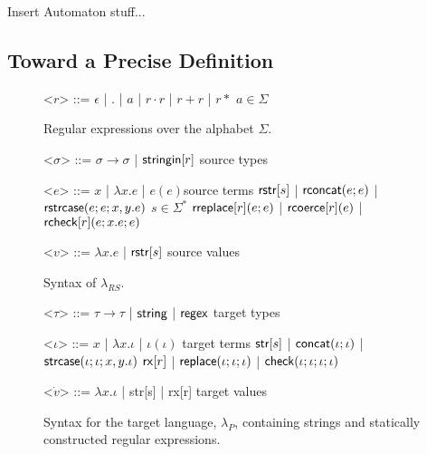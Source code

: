 \documentclass[12pt]{article}
\theoremstyle{definition}
\newcommand{\lambdap}{\lambda_P}
\newcommand{\sisubst}[3]{{\sf rreplace}[#1](#2;#3)} \newcommand{\rreplace}[3]{{\sf rreplace}[#1](#2;#3)} %
\newcommand{\rcoerce}[2]{{\sf rcoerce}[#1](#2)}
\newcommand{\sistr}[1]{{\sf rstr}[#1]}   \newcommand{\rstr}[1]{{\sf rstr}[#1]} %
\newcommand{\rcheck}[4]{ {\sf rcheck}[#1](#2;#3;#4) }
\newcommand{\strin}[1]{\sistr{#1}}
\newcommand{\rsconcat}[2]{{\sf rconcat}(#1;#2)} \newcommand{\rconcat}[2]{{\sf rconcat}(#1;#2)} %
\newcommand{\stringin}[1]{{\sf stringin}[#1]}
\newcommand{\tcheck}[4]{{\sf check}(#1; #2; #3; #4)}
\renewcommand{\tstr}[1]{{{\sf str}[#1]}}
\newcommand{\preplace}[3]{{\sf replace}(#1;#2;#3)}
\newcommand{\tconcat}[2]{{\sf concat}(#1;#2)} \newcommand{\concat}[2]{{\sf concat}(#1;#2)} %
\newcommand{\rx}[1]{ {\sf rx}[#1] }
\newcommand{\str}{{\sf string}}
\newcommand{\regex}{{\sf regex}}
\newcommand{\strcase}[3]{ {\sf rstrcase}(#1; #2; #3)}
\newcommand{\pstrcase}[3]{ {\sf strcase}(#1; #2; #3)}
\begin{document}
Insert Automaton stuff...


\subsection{Toward a Precise Definition}







\renewcommand{\grammarlabel}[2]{#1\hfill#2}
\begin{figure}[b]
\small
  \begin{grammar}
<$r$> ::= $\epsilon$ | $.$ | $a$ | $r \cdot r$ | $r + r$ | $r*$ \hfill $a \in \Sigma$

\caption{Regular expressions over the alphabet $\Sigma$.}
\label{fig:regex}
\end{grammar}
\end{figure}
\begin{figure}[t]
\small
  \begin{grammar}
<$\sigma$> ::=  $\sigma \rightarrow \sigma$ | $\stringin{r}$    \hfill  source types

<$e$> ::= 
      $x$ | $\lambda x . e$ | $e(e) $\hfill source terms \alt 
      $\strin{s}$ | $\rsconcat{e}{e}$ | $\strcase{e}{e}{x,y.e}$ \hfill $s \in \Sigma^{*}$ \alt
      $\sisubst{r}{e}{e}$ | $\rcoerce{r}{e}$ | $\rcheck{r}{e}{x.e}{e}$

<$v$> ::= $\lambda x . e$ | $\strin{s}$ \hfill source values 
\caption{Syntax of $\lambda_{RS}$.}
\label{fig:glambdas}
\end{grammar}
\end{figure}


\renewcommand{\grammarlabel}[2]{#1\hfill#2}

\begin{figure}[t]
\small
  \begin{grammar}

<$\tau$> ::= $\tau \rightarrow \tau$ | $\str$ | $\regex$ \hfill target types

<$\iota$> ::= $x$ | $\lambda x . \iota$ | $\iota(\iota)$ \hfill target terms \alt
$\tstr{s}$ | $\tconcat{\iota}{\iota}$ | $\pstrcase{\iota}{\iota}{x,y.\iota}$ \alt
  $\rx{r}$ | $\preplace{\iota}{\iota}{\iota}$ | $\tcheck{\iota}{\iota}{\iota}{\iota}$ 

  <$\dot{v}$> ::= $\lambda x . \iota$ | \tstr{s} | \rx{r} \hfill target values

\end{grammar}
\caption{Syntax for the target language, $\lambdap$, containing strings and statically constructed regular expressions.}
\label{fig:lcsSyntax}
\end{figure}
\end{document}

